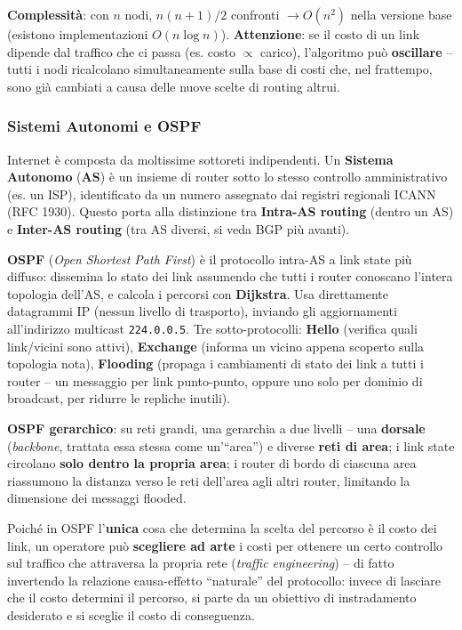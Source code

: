 \documentclass[12pt, a4paper]{article}
\begin{document}
\textbf{Complessità}: con $n$ nodi, $n(n+1)/2$ confronti $\to O(n^2)$ nella versione base (esistono implementazioni $O(n\log n)$). \textbf{Attenzione}: se il costo di un link dipende dal traffico che ci passa (es. costo $\propto$ carico), l'algoritmo può \textbf{oscillare} -- tutti i nodi ricalcolano simultaneamente sulla base di costi che, nel frattempo, sono già cambiati a causa delle nuove scelte di routing altrui.

\subsubsection{Sistemi Autonomi e OSPF}

Internet è composta da moltissime sottoreti indipendenti. Un \textbf{Sistema Autonomo} (\textbf{AS}) è un insieme di router sotto lo stesso controllo amministrativo (es. un ISP), identificato da un numero assegnato dai registri regionali ICANN (RFC 1930). Questo porta alla distinzione tra \textbf{Intra-AS routing} (dentro un AS) e \textbf{Inter-AS routing} (tra AS diversi, si veda BGP più avanti).

\textbf{OSPF} (\textit{Open Shortest Path First}) è il protocollo intra-AS a link state più diffuso: dissemina lo stato dei link assumendo che tutti i router conoscano l'intera topologia dell'AS, e calcola i percorsi con \textbf{Dijkstra}. Usa direttamente datagrammi IP (nessun livello di trasporto), inviando gli aggiornamenti all'indirizzo multicast \texttt{224.0.0.5}. Tre sotto-protocolli: \textbf{Hello} (verifica quali link/vicini sono attivi), \textbf{Exchange} (informa un vicino appena scoperto sulla topologia nota), \textbf{Flooding} (propaga i cambiamenti di stato dei link a tutti i router -- un messaggio per link punto-punto, oppure uno solo per dominio di broadcast, per ridurre le repliche inutili).

\textbf{OSPF gerarchico}: su reti grandi, una gerarchia a due livelli -- una \textbf{dorsale} (\textit{backbone}, trattata essa stessa come un'``area'') e diverse \textbf{reti di area}; i link state circolano \textbf{solo dentro la propria area}; i router di bordo di ciascuna area riassumono la distanza verso le reti dell'area agli altri router, limitando la dimensione dei messaggi flooded.

\begin{tcolorbox}[colback=cyan!5, colframe=blue!40!black, title=\textbf{Il costo dei link non è ``neutro''}]
Poiché in OSPF l'\textbf{unica} cosa che determina la scelta del percorso è il costo dei link, un operatore può \textbf{scegliere ad arte} i costi per ottenere un certo controllo sul traffico che attraversa la propria rete (\textit{traffic engineering}) -- di fatto invertendo la relazione causa-effetto ``naturale'' del protocollo: invece di lasciare che il costo determini il percorso, si parte da un obiettivo di instradamento desiderato e si sceglie il costo di conseguenza.
\end{tcolorbox}
\end{document}
